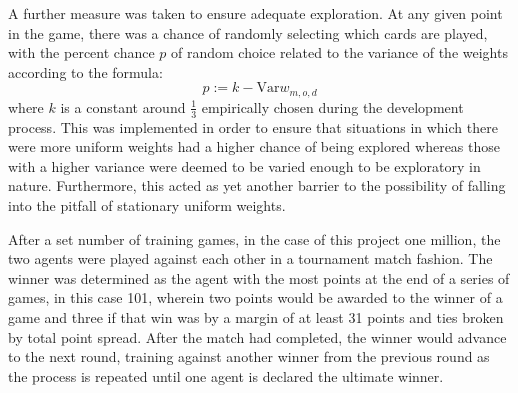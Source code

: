 \newcommand{\Var}{\mathrm{Var}}
A further measure was taken to ensure adequate exploration.
%
At any given point in the game,
there was a chance of randomly selecting which cards are played,
with the percent chance $p$ of random choice related to the variance of the 
weights according to the formula:
\[
	p := k - \Var{w_{m,o,d}}
\]
where $k$ is a constant around $\frac{1}{3}$ empirically chosen during the
development process.
%
This was implemented in order to ensure that situations in which there were
more uniform weights had a higher chance of being explored
whereas those with a higher variance were deemed to be varied enough to be
exploratory in nature.
%
Furthermore, this acted as yet another barrier to the possibility of falling
into the pitfall of stationary uniform weights.

After a set number of training games,
in the case of this project one million,
the two agents were played against each other in a tournament match fashion.
%
The winner was determined as the agent with the most points at the end
of a series of games, %
in this case 101, %
wherein two points would be awarded to the winner of a game and three if that
win was by a margin of at least 31 points
and ties broken by total point spread.
%
After the match had completed,
the winner would advance to the next round,
training against another winner from the previous round as the process is
repeated until one agent is declared the ultimate winner.

